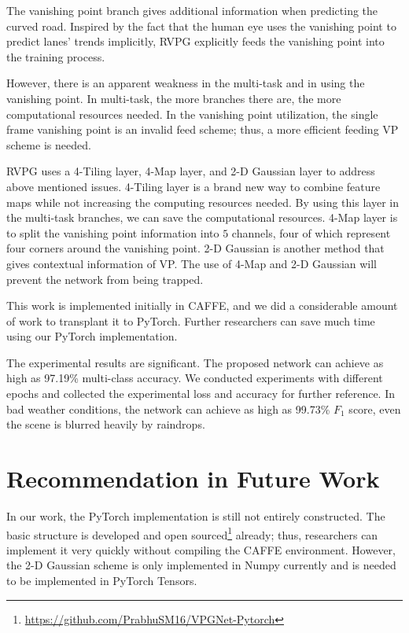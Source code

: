 \begin{spacing}{1.5}
The vanishing point branch gives additional information when predicting the curved road. Inspired by the fact that the human eye uses the vanishing point to predict lanes' trends implicitly, RVPG explicitly feeds the vanishing point into the training process.

However, there is an apparent weakness in the multi-task and in using the vanishing point. In multi-task, the more branches there are, the more computational resources needed. In the vanishing point utilization, the single frame vanishing point is an invalid feed scheme; thus, a more efficient feeding VP scheme is needed.

RVPG uses a 4-Tiling layer, 4-Map layer, and 2-D Gaussian layer to address above mentioned issues. 4-Tiling layer is a brand new way to combine feature maps while not increasing the computing resources needed. By using this layer in the multi-task branches, we can save the computational resources. 4-Map layer is to split the vanishing point information into $5$ channels, four of which represent four corners around the vanishing point. 2-D Gaussian is another method that gives contextual information of VP. The use of 4-Map and 2-D Gaussian will prevent the network from being trapped.

This work is implemented initially in CAFFE, and we did a considerable amount of work to transplant it to PyTorch. Further researchers can save much time using our PyTorch implementation.

The experimental results are significant. The proposed network can achieve as high as 97.19\% multi-class accuracy. We conducted experiments with different epochs and collected the experimental loss and accuracy for further reference. In bad weather conditions, the network can achieve as high as 99.73\% $F_1$ score, even the scene is blurred heavily by raindrops.

\section{Recommendation in Future Work}


In our work, the PyTorch implementation is still not entirely constructed. The basic structure is developed and open sourced\footnote{\url{https://github.com/PrabhuSM16/VPGNet-Pytorch}} already; thus, researchers can implement it very quickly without compiling the CAFFE environment. However, the 2-D Gaussian scheme is only implemented in Numpy currently and is needed to be implemented in PyTorch Tensors. 


\end{spacing}
